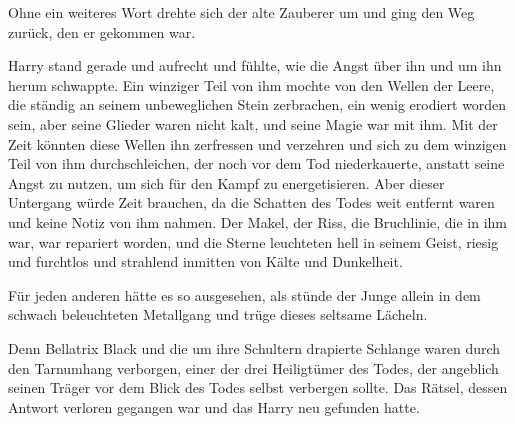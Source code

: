 Ohne ein weiteres Wort drehte sich der alte Zauberer um und ging den Weg zurück, den er gekommen war.

\later

Harry stand gerade und aufrecht und fühlte, wie die Angst über ihn und um ihn herum schwappte. Ein winziger Teil von ihm mochte von den Wellen der Leere, die ständig an seinem unbeweglichen Stein zerbrachen, ein wenig erodiert worden sein, aber seine Glieder waren nicht kalt, und seine Magie war mit ihm. Mit der Zeit könnten diese Wellen ihn zerfressen und verzehren und sich zu dem winzigen Teil von ihm durchschleichen, der noch vor dem Tod niederkauerte, anstatt seine Angst zu nutzen, um sich für den Kampf zu energetisieren. Aber dieser Untergang würde Zeit brauchen, da die Schatten des Todes weit entfernt waren und keine Notiz von ihm nahmen. Der Makel, der Riss, die Bruchlinie, die in ihm war, war repariert worden, und die Sterne leuchteten hell in seinem Geist, riesig und furchtlos und strahlend inmitten von Kälte und Dunkelheit.

Für jeden anderen hätte es so ausgesehen, als stünde der Junge allein in dem schwach beleuchteten Metallgang und trüge dieses seltsame Lächeln.

Denn Bellatrix Black und die um ihre Schultern drapierte Schlange waren durch den Tarnumhang verborgen, einer der drei Heiligtümer des Todes, der angeblich seinen Träger vor dem Blick des Todes selbst verbergen sollte. Das Rätsel, dessen Antwort verloren gegangen war und das Harry neu gefunden hatte.


